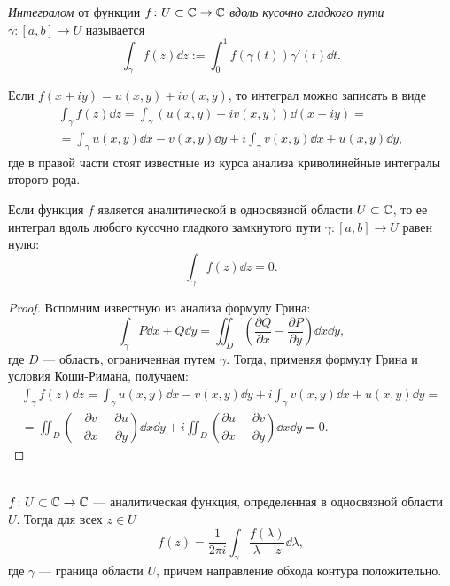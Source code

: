 \begin{definition}
    \emph{Интегралом} от функции $f \colon U \subset \mathbb{C} \to \mathbb{C}$ \emph{вдоль
        кусочно гладкого пути} $\gamma \colon [a, b] \to U$ называется 
    \[ \int_\gamma f(z) \dd z := \int_0^1 f(\gamma(t)) \gamma'(t) \dd t. \]
\end{definition}

Если $f(x + i y) = u(x, y) + i v(x, y)$, то интеграл можно записать в виде
\begin{multline*}
 \int_\gamma f(z) \dd z = \int_\gamma (u(x, y) + i v(x, y)) \dd (x + i y) =\\ = 
   \int_\gamma u(x, y) \dd x - v(x, y) \dd y + i \int_\gamma v(x, y) \dd x + u(x, y) \dd y, 
\end{multline*}
где в правой части стоят известные из курса анализа криволинейные интегралы второго рода.

\begin{theorem}[Коши]
    Если функция $f$ является аналитической в односвязной области $U \subset \mathbb{C}$,
    то ее интеграл вдоль любого кусочно гладкого замкнутого 
    пути $\gamma \colon [a, b] \to U$ равен нулю:
    \[ \int_{\gamma} f(z) \dd z = 0. \]
\end{theorem}

\begin{proof}
    Вспомним известную из анализа формулу Грина:
    \[ \int_\gamma P \dd x + Q \dd y = \iint_D \left(\dfrac{\partial Q}{\partial x} - \dfrac{\partial P}{\partial y}\right) \dd x \dd y, \]
    где $D$ --- область, ограниченная путем $\gamma$.
    Тогда, применяя формулу Грина и условия Коши-Римана, получаем:
    \begin{multline*}
     \int_\gamma f(z) \dd z =  
       \int_\gamma u(x, y) \dd x - v(x, y) \dd y + i \int_\gamma v(x, y) \dd x + u(x, y) \dd y = \\ = \iint_D \left(-\dfrac{\partial v}{\partial x} - \dfrac{\partial u}{\partial y}\right) \dd x \dd y + i \iint_D \left(\dfrac{\partial u}{\partial x} - \dfrac{\partial v}{\partial y}\right) \dd x \dd y = 0.
    \end{multline*}
\end{proof}

\begin{theorem}\label{th:cauchy_formula}\hfill\\
     $f \colon U \subset \mathbb{C} \to \mathbb{C}$ --- аналитическая функция, определенная
    в односвязной области $U$. Тогда для всех $z \in U$
    \[ f(z) = \frac{1}{2 \pi i} \int_\gamma \frac{f(\lambda)}{\lambda - z} \dd \lambda, \]
    где $\gamma$ --- граница области $U$, причем направление обхода контура положительно.
\end{theorem}

